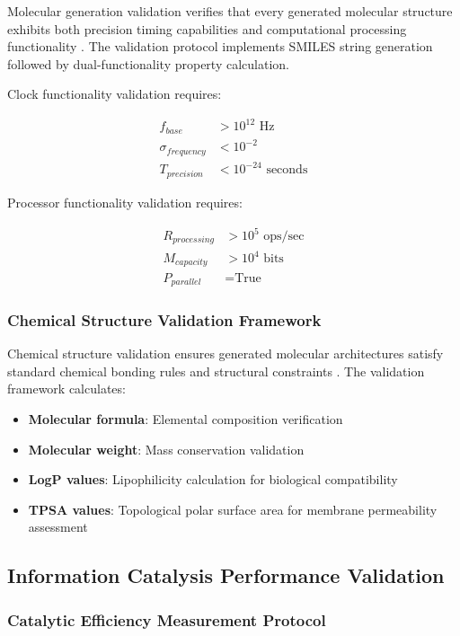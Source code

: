 Molecular generation validation verifies that every generated molecular structure exhibits both precision timing capabilities and computational processing functionality \cite{lloyd2000ultimate}. The validation protocol implements SMILES string generation followed by dual-functionality property calculation.

Clock functionality validation requires:

\begin{align}
f_{base} &> 10^{12} \text{ Hz} \\
\sigma_{frequency} &< 10^{-2} \\
T_{precision} &< 10^{-24} \text{ seconds}
\end{align}

Processor functionality validation requires:

\begin{align}
R_{processing} &> 10^{5} \text{ ops/sec} \\
M_{capacity} &> 10^{4} \text{ bits} \\
P_{parallel} &= \text{True}
\end{align}

\subsubsection{Chemical Structure Validation Framework}

Chemical structure validation ensures generated molecular architectures satisfy standard chemical bonding rules and structural constraints \cite{jensen2017introduction}. The validation framework calculates:

\begin{itemize}
\item \textbf{Molecular formula}: Elemental composition verification
\item \textbf{Molecular weight}: Mass conservation validation
\item \textbf{LogP values}: Lipophilicity calculation for biological compatibility
\item \textbf{TPSA values}: Topological polar surface area for membrane permeability assessment
\end{itemize}

\subsection{Information Catalysis Performance Validation}

\subsubsection{Catalytic Efficiency Measurement Protocol}

